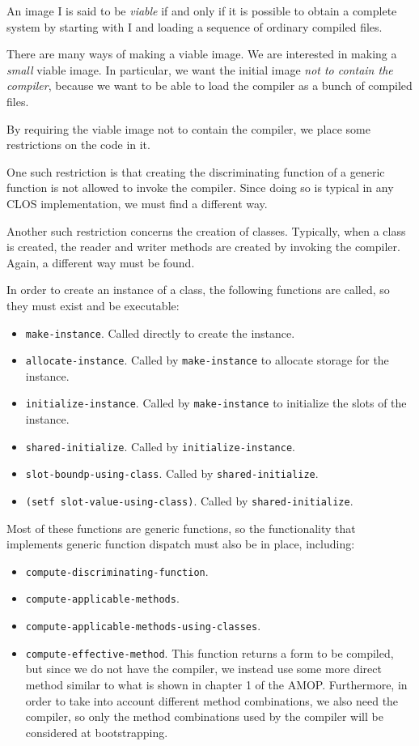 An image I is said to be \emph{viable} if and only if it is possible
to obtain a complete \commonlisp{} system by starting with I and loading a
sequence of ordinary compiled files.

There are many ways of making a viable image.  We are interested in
making a \emph{small} viable image.  In particular, we want the
initial image \emph{not to contain the compiler}, because we want to
be able to load the compiler as a bunch of compiled files. 

By requiring the viable image not to contain the compiler, we place
some restrictions on the code in it.  

One such restriction is that creating the discriminating function of a
generic function is not allowed to invoke the compiler.  Since doing
so is typical in any CLOS implementation, we must find a different
way.

Another such restriction concerns the creation of classes.  Typically,
when a class is created, the reader and writer methods are created by
invoking the compiler.  Again, a different way must be found.

In order to create an instance of a class, the following functions
are called, so they must exist and be executable:

\begin{itemize}
\item \texttt{make-instance}.  Called directly to create the instance.
\item \texttt{allocate-instance}.  Called by \texttt{make-instance} to
  allocate storage for the instance.
\item \texttt{initialize-instance}.  Called by \texttt{make-instance}
  to initialize the slots of the instance.
\item \texttt{shared-initialize}.  Called by
  \texttt{initialize-instance}.
\item \texttt{slot-boundp-using-class}.  Called by \texttt{shared-initialize}.
\item \texttt{(setf slot-value-using-class)}.  Called by
  \texttt{shared-initialize}.
\end{itemize}

Most of these functions are generic functions, so the functionality
that implements generic function dispatch must also be in place,
including:

\begin{itemize}
\item \texttt{compute-discriminating-function}.
\item \texttt{compute-applicable-methods}.
\item \texttt{compute-applicable-methods-using-classes}.
\item \texttt{compute-effective-method}.  This function returns a form
  to be compiled, but since we do not have the compiler, we instead
  use some more direct method similar to what is shown in chapter 1 of
  the AMOP.  Furthermore, in order to take into account different
  method combinations, we also need the compiler, so only the method
  combinations used by the compiler will be considered at
  bootstrapping.
\end{itemize}

